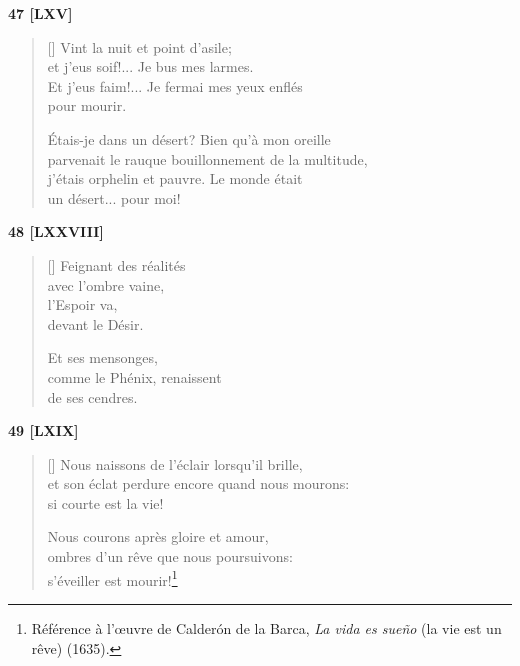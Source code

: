\documentclass[a4paper,12pt]{book}
\begin{document}
\bigskip

\begin{center}
  \textbf{47 [LXV]}
\end{center}

\settowidth{\versewidth}{parvenait le rauque bouillonnement de la multitude,}

\begin{verse}[\versewidth]
  Vint la nuit et point d'asile; \\
  et j'eus soif!... Je bus mes larmes. \\
  Et j'eus faim!... Je fermai mes yeux enflés \\
  pour mourir.

  Étais-je dans un désert? Bien qu'à mon oreille \\
  parvenait le rauque bouillonnement de la multitude, \\
  j'étais orphelin et pauvre. Le monde était \\
  un désert... pour moi!
\end{verse}

\bigskip

\begin{center}
  \textbf{48 [LXXVIII]}
\end{center}

\settowidth{\versewidth}{comme le Phénix, renaissent}

\begin{verse}[\versewidth]
  Feignant des réalités \\
  avec l'ombre vaine, \\
  l'Espoir va, \\
  devant le Désir.

  Et ses mensonges, \\
  comme le Phénix, renaissent \\
  de ses cendres.
\end{verse}

\bigskip

\begin{center}
  \textbf{49 [LXIX]}
\end{center}

\settowidth{\versewidth}{et son éclat perdure encore quand nous mourons:}

\begin{verse}[\versewidth]
  Nous naissons de l'éclair lorsqu'il brille, \\
  et son éclat perdure encore quand nous mourons: \\
  si courte est la vie!

  Nous courons après gloire et amour, \\
  ombres d'un rêve que nous poursuivons: \\
  s'éveiller est mourir!\footnote{Référence à l'œuvre de Calderón de
  la Barca, \emph{La vida es sueño} (la vie est un rêve) (1635).}
\end{verse}
\end{document}

